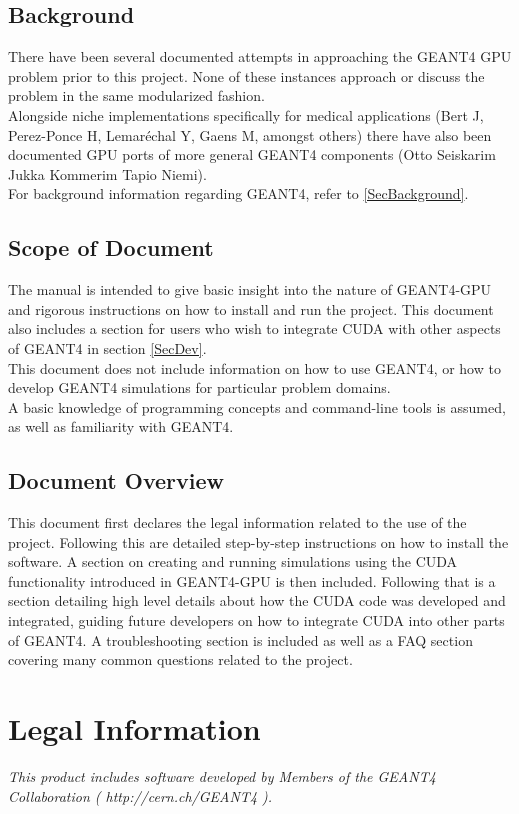 \documentclass[12pt]{article}
\begin{document}
\subsection{Background} %
There have been several documented attempts in approaching the GEANT4 GPU problem prior to this project. None of these instances approach or discuss the problem in the same modularized fashion.\\ 
Alongside niche implementations specifically for medical applications (Bert J, Perez-Ponce H, Lemaréchal Y, Gaens M, amongst others) there have also been documented GPU ports of more general GEANT4 components (Otto Seiskarim Jukka Kommerim Tapio Niemi).\\
For background information regarding GEANT4, refer to \ref{SecBackground}.

\subsection{Scope of Document} %
The manual is intended to give basic insight into the nature of GEANT4-GPU and rigorous instructions on how to install and run the project. This document also includes a section for users who wish to integrate CUDA with other aspects of GEANT4 in section \ref{SecDev}.\\

This document does not include information on how to use GEANT4, or how to develop GEANT4 simulations for particular problem domains.\\

A basic knowledge of programming concepts and command-line tools is assumed, as well as familiarity with GEANT4.
\subsection{Document Overview} %
This document first declares the legal information related to the use of the project. Following this are detailed step-by-step instructions on how to install the software. A section on creating and running simulations using the CUDA functionality introduced in GEANT4-GPU is then included. Following that is a section detailing high level details about how the CUDA code was developed and integrated, guiding future developers on how to integrate CUDA into other parts of GEANT4. A troubleshooting section is included as well as a FAQ section covering many common questions related to the project.

\section{Legal Information}	%
\emph{This product includes software developed by Members of the GEANT4 Collaboration ( http://cern.ch/GEANT4 ).}
\end{document}
